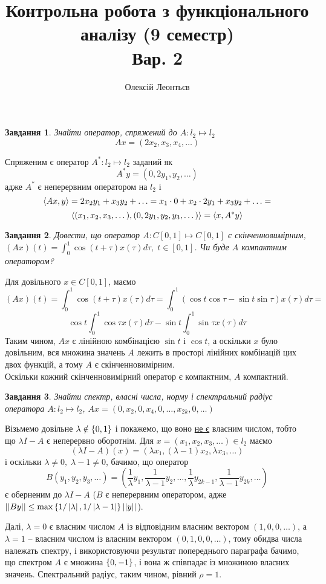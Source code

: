 \documentclass[10pt]{article}
\title{Контрольна робота з функціонального аналізу (9 семестр)\\Вар. 2}
\author{Олексій Леонтьєв}
\newtheorem{prob}{Завдання}
\begin{document}
\maketitle
\begin{prob}Знайти оператор, спряжений до $A:l_2\mapsto l_2$\[Ax=({2}x_2,x_3,x_4,\dots)\]\end{prob}
	Спряженим є оператор $A^*:l_2\mapsto l_2$ заданий як
	\[A^*y=(0,2y_1,y_2,\dots)\]
	адже $A^*$ є неперервним оператором на $l_2$ і
	\[\left<Ax,y\right>=2x_2{y_1}+x_3{y_2}+\hdots=
	x_1\cdot 0+x_2\cdot{{2}y_1}+x_3{y_2}+\hdots=\]
	\[\left<(x_1,x_2,x_3,\dots),(0,{2}y_1,y_2,y_3,\dots)\right>=\left<x,A^*y\right>\]
\begin{prob}Довести, що оператор $A:C[0,1]\mapsto C[0,1]$ є скінченновимірним, $(Ax)(t)=\int_0^{1}\cos(t+\tau)x(\tau)d\tau,\;t\in[0,1]$.
	Чи буде $A$ компактним оператором?\end{prob}
	Для довільного $x\in C[0,1]$, маємо
	\[(Ax)(t)=\int_0^{1}\cos(t+\tau)x(\tau)d\tau=\int_0^{1}\left(\cos t\cos\tau-\sin t\sin\tau\right)x(\tau)d\tau=\]
	\[\cos t\int_0^{1}\cos\tau x(\tau)d\tau-\sin t\int_0^{1}\sin\tau x(\tau)d\tau\]
	Таким чином, $Ax$ є лінійною комбінацією $\sin t$ і $\cos t$, а оскільки $x$ було довільним, вся множина значень $A$ лежить в просторі
	лінійних комбінацій цих двох функцій, а тому $A$ є скінченновимірним.\\
	Оскільки кожний скінченновимірний оператор є компактним, $A$ компактний.
	\begin{prob}Знайти спектр, власні числа, норму і спектральний радіус оператора $A:l_2\mapsto l_2$, $Ax=(0,x_2,0,x_4,0,\hdots,x_{2k},0,\hdots)
		$\end{prob}
	Візьмемо довільне $\lambda\notin\left\{0,1\right\}$ і покажемо, що воно \uline{не є} власним числом, тобто що $\lambda I-A$ є неперервно
	оборотнім. Для $x=(x_1,x_2,x_3,\hdots)\in l_2$ маємо
	\[(\lambda I-A)(x)=(\lambda x_1,(\lambda-1)x_2,\lambda x_3,\hdots)\]
	і оскільки $\lambda\neq0,\;\lambda-1\neq0$,
	бачимо, що оператор \[B(y_1,y_2,y_3,\hdots)=(\frac{1}{\lambda}y_1,\frac{1}{\lambda-1}y_2,\hdots,\frac{1}{\lambda}y_{2k-1},\frac{1}{\lambda-1
	}y_{2k},\hdots)\]
	є оберненим до $\lambda I-A$ ($B$ є неперервним оператором, адже 
	$\mynorm{By}\leq\max\mycbra{1/\myabs{\lambda},1/\myabs{\lambda-1}}\mynorm{y}$).

	Далі, $\lambda=0$ є власним числом $A$ із відповідним власним вектором $(1,0,0,\hdots)$, а $\lambda=1$ -- власним числом із власним вектором
	$(0,1,0,0,\hdots)$, тому обидва числа належать спектру, і використовуючи результат попереднього параграфа бачимо, що спектром $A$ є
	множина $\left\{0,-1\right\}$, і вона ж співпадає із множиною власних значень. Спектральний радіус, таким чином, рівний $\rho=1$.
\end{document}
